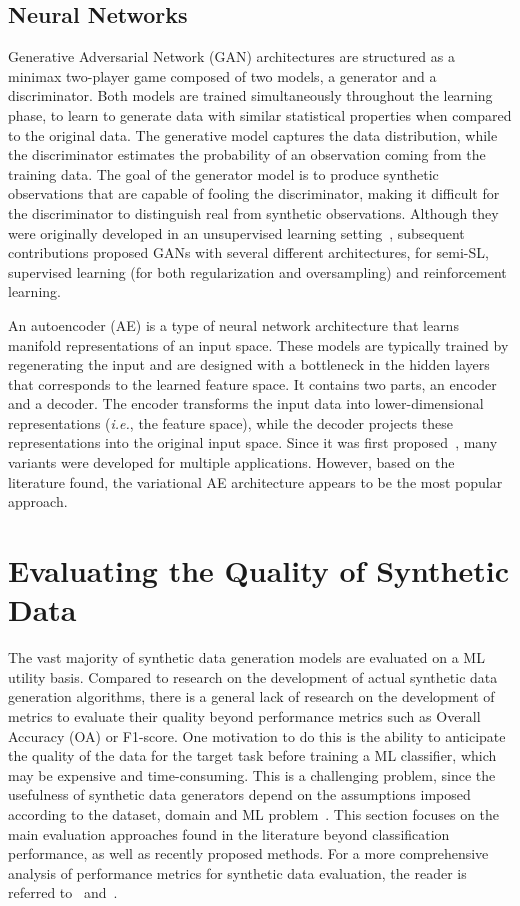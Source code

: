 \documentclass[parskip=full]{scrartcl}
\begin{document}
\subsection{Neural Networks}

Generative Adversarial Network (GAN) architectures are structured as a minimax
two-player game composed of two models, a generator and a discriminator. Both
models are trained simultaneously throughout the learning phase, to learn to
generate data with similar statistical properties when compared to the
original data. The generative model captures the data distribution, while the
discriminator estimates the probability of an observation coming from the
training data. The goal of the generator model is to produce synthetic
observations that are capable of fooling the discriminator, making it
difficult for the discriminator to distinguish real from synthetic
observations. Although they were originally developed in an unsupervised
learning setting~\cite{goodfellow2020generative}, subsequent contributions
proposed GANs with several different architectures, for semi-SL, supervised
learning (for both regularization and oversampling) and reinforcement
learning.

An autoencoder (AE) is a type of neural network architecture that learns
manifold representations of an input space. These models are typically trained
by regenerating the input and are designed with a bottleneck in the hidden
layers that corresponds to the learned feature space. It contains two parts,
an encoder and a decoder. The encoder transforms the input data into
lower-dimensional representations (\textit{i.e.}, the feature space), while
the decoder projects these representations into the original input space.
Since it was first proposed~\cite{ackley1985learning}, many variants were
developed for multiple applications. However, based on the literature found,
the variational AE architecture appears to be the most popular approach.

\section{Evaluating the Quality of Synthetic Data
}\label{sec:evaluating-synthetic-data}

The vast majority of synthetic data generation models are evaluated on a ML
utility basis. Compared to research on the development of actual synthetic
data generation algorithms, there is a general lack of research on the
development of metrics to evaluate their quality beyond performance metrics
such as Overall Accuracy (OA) or F1-score. One motivation to do this is the
ability to anticipate the quality of the data for the target task before
training a ML classifier, which may be expensive and time-consuming.  This is
a challenging problem, since the usefulness of synthetic data generators
depend on the assumptions imposed according to the dataset, domain and ML
problem~\cite{chundawat2022tabsyndex}. This section focuses on the main
evaluation approaches found in the literature beyond classification
performance, as well as recently proposed methods. For a more comprehensive
analysis of performance metrics for synthetic data evaluation, the reader is
referred to~\cite{dankar2022multi} and~\cite{theis2016note}.
\end{document}
